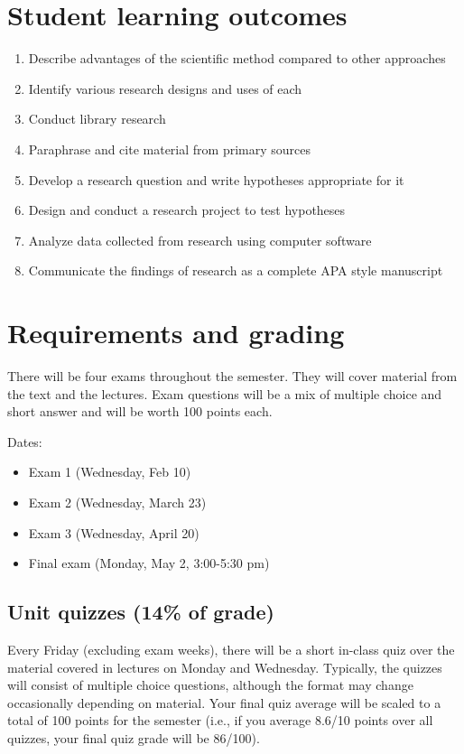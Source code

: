 \documentclass[10pt]{article}
\begin{document}
\section*{Student learning outcomes}
\label{sec-4}

\begin{enumerate}
\item Describe advantages of the scientific method compared to other approaches
\item Identify various research designs and uses of each
\item Conduct library research
\item Paraphrase and cite material from primary sources
\item Develop a research question and write hypotheses appropriate for it
\item Design and conduct a research project to test hypotheses
\item Analyze data collected from research using computer software
\item Communicate the findings of research as a complete APA style manuscript
\end{enumerate}

\section*{Requirements and grading}
\label{sec-5}

There will be four exams throughout the semester.  They will cover material from the text and the lectures.  Exam questions will be a mix of multiple choice and short answer and will be worth 100 points each.

Dates:

\begin{itemize}
\item Exam 1 (Wednesday, Feb 10)
\item Exam 2 (Wednesday, March 23)
\item Exam 3 (Wednesday, April 20)
\item Final exam (Monday, May 2, 3:00-5:30 pm)
\end{itemize}

\subsection*{Unit quizzes (14\% of grade)}
\label{sec-5-1}

Every Friday (excluding exam weeks), there will be a short in-class quiz over the material covered in lectures on Monday and Wednesday. Typically, the quizzes will consist of multiple choice questions, although the format may change occasionally depending on material.  Your final quiz average will be scaled to a total of 100 points for the semester (i.e., if you average 8.6/10 points over all quizzes, your final quiz grade will be 86/100).
\end{document}

